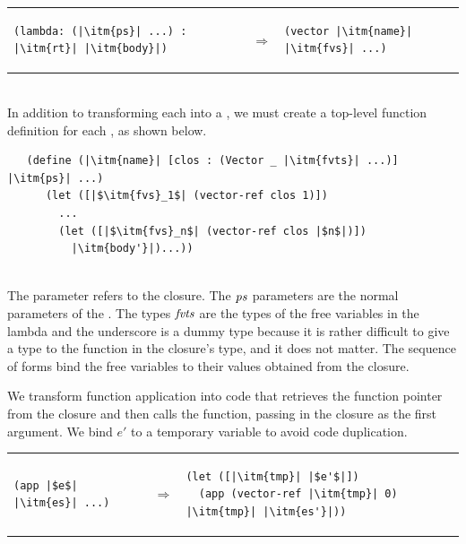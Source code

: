 \documentclass[11pt]{book}
\begin{document}
\begin{tabular}{lll}
\begin{minipage}{0.4\textwidth}
\begin{lstlisting}
(lambda: (|\itm{ps}| ...) : |\itm{rt}| |\itm{body}|)
\end{lstlisting}
\end{minipage}
&
$\Rightarrow$
&
\begin{minipage}{0.4\textwidth}
\begin{lstlisting}
(vector |\itm{name}| |\itm{fvs}| ...)
\end{lstlisting}
\end{minipage}
\end{tabular}  \\
%
In addition to transforming each  into a , we
must create a top-level function definition for each , as
shown below.\\
\begin{minipage}{0.8\textwidth}
  \begin{lstlisting}
   (define (|\itm{name}| [clos : (Vector _ |\itm{fvts}| ...)] |\itm{ps}| ...)
      (let ([|$\itm{fvs}_1$| (vector-ref clos 1)])
        ...
        (let ([|$\itm{fvs}_n$| (vector-ref clos |$n$|)])
          |\itm{body'}|)...))
\end{lstlisting}
\end{minipage}\\
The  parameter refers to the closure. The $\mathit{ps}$
parameters are the normal parameters of the . The types
$\mathit{fvts}$ are the types of the free variables in the lambda and the
underscore is a dummy type because it is rather difficult to give a
type to the function in the closure's type, and it does not matter.
The sequence of  forms bind the free variables to their
values obtained from the closure.

We transform function application into code that retrieves the
function pointer from the closure and then calls the function, passing
in the closure as the first argument. We bind $e'$ to a temporary
variable to avoid code duplication.

\begin{tabular}{lll}
\begin{minipage}{0.3\textwidth}
\begin{lstlisting}
(app |$e$| |\itm{es}| ...)
\end{lstlisting}
\end{minipage}
&
$\Rightarrow$
&
\begin{minipage}{0.5\textwidth}
\begin{lstlisting}
(let ([|\itm{tmp}| |$e'$|])
  (app (vector-ref |\itm{tmp}| 0) |\itm{tmp}| |\itm{es'}|))
\end{lstlisting}
\end{minipage}
\end{tabular}  \\
\end{document}
